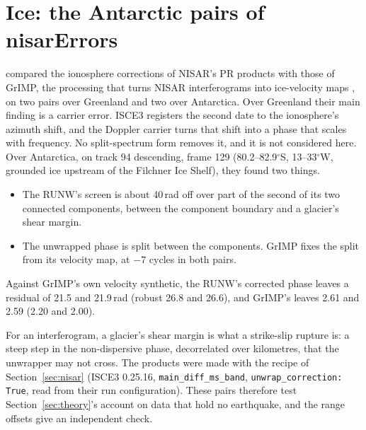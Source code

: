 \section{Ice: the Antarctic pairs of nisarErrors}
\label{sec:antarctica}

\citet{joughin2026nisarerrors} compared the ionosphere corrections of NISAR's PR products with those of GrIMP, the
processing that turns NISAR interferograms into ice-velocity maps \citep{joughin2018grimp}, on two pairs over Greenland
and two over Antarctica. Over Greenland their main finding is a carrier error. ISCE3 registers the second date to the
ionosphere's azimuth shift, and the Doppler carrier turns that shift into a phase that scales with frequency. No
split-spectrum form removes it, and it is not considered here. Over Antarctica, on track 94 descending, frame 129
(80.2--82.9$^\circ$S, 13--33$^\circ$W, grounded ice upstream of the Filchner Ice Shelf), they found two things.
\begin{itemize}
  \item The RUNW's screen is about 40\,rad off over part of the second of its two connected components, between the
        component boundary and a glacier's shear margin.
  \item The unwrapped phase is split between the components. GrIMP fixes the split from its velocity map, at $-7$
        cycles in both pairs.
\end{itemize}
Against GrIMP's own velocity synthetic, the RUNW's corrected phase leaves a residual of 21.5 and 21.9\,rad (robust 26.8
and 26.6), and GrIMP's leaves 2.61 and 2.59 (2.20 and 2.00).

For an interferogram, a glacier's shear margin is what a strike-slip rupture is: a steep step in the non-dispersive
phase, decorrelated over kilometres, that the unwrapper may not cross. The products were made with the recipe of
Section~\ref{sec:nisar} (ISCE3 0.25.16, \texttt{main\_diff\_ms\_band}, \texttt{unwrap\_correction: True}, read from
their run configuration). These pairs therefore test Section~\ref{sec:theory}'s account on data that hold no
earthquake, and the range offsets give an independent check.

